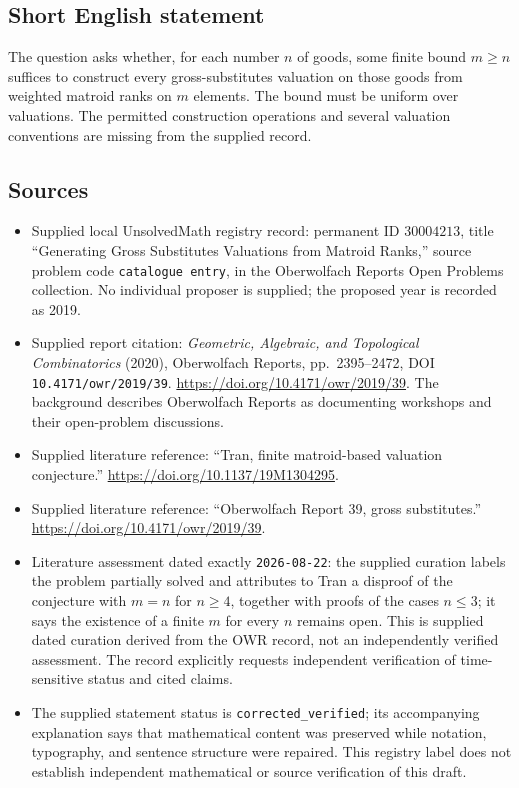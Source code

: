 \documentclass[11pt]{article}
\begin{document}
\subsection{Short English statement}
The question asks whether, for each number \(n\) of goods, some finite bound \(m\ge n\) suffices to construct every gross-substitutes valuation on those goods from weighted matroid ranks on \(m\) elements. The bound must be uniform over valuations. The permitted construction operations and several valuation conventions are missing from the supplied record.
\subsection{Sources}
\begin{itemize}
\item Supplied local UnsolvedMath registry record: permanent ID \(30004213\), title ``Generating Gross Substitutes Valuations from Matroid Ranks,'' source problem code \texttt{catalogue entry}, in the Oberwolfach Reports Open Problems collection. No individual proposer is supplied; the proposed year is recorded as 2019.
\item Supplied report citation: \emph{Geometric, Algebraic, and Topological Combinatorics} (2020), Oberwolfach Reports, pp.\ 2395--2472, DOI \texttt{10.4171/owr/2019/39}. \url{https://doi.org/10.4171/owr/2019/39}. The background describes Oberwolfach Reports as documenting workshops and their open-problem discussions.
\item Supplied literature reference: ``Tran, finite matroid-based valuation conjecture.'' \url{https://doi.org/10.1137/19M1304295}.
\item Supplied literature reference: ``Oberwolfach Report 39, gross substitutes.'' \url{https://doi.org/10.4171/owr/2019/39}.
\item Literature assessment dated exactly \texttt{2026-08-22}: the supplied curation labels the problem partially solved and attributes to Tran a disproof of the conjecture with \(m=n\) for \(n\ge4\), together with proofs of the cases \(n\le3\); it says the existence of a finite \(m\) for every \(n\) remains open. This is supplied dated curation derived from the OWR record, not an independently verified assessment. The record explicitly requests independent verification of time-sensitive status and cited claims.
\item The supplied statement status is \texttt{corrected\_verified}; its accompanying explanation says that mathematical content was preserved while notation, typography, and sentence structure were repaired. This registry label does not establish independent mathematical or source verification of this draft.
\end{itemize}
\end{document}
